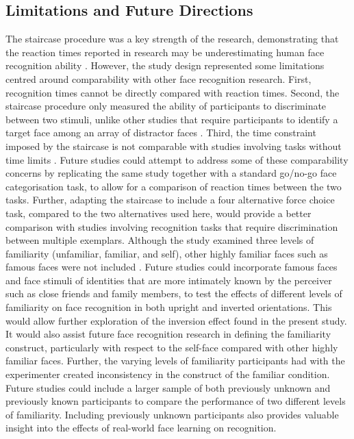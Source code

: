\documentclass[
  10pt,
  letterpaper,
]{article}
\begin{document}
\subsection{Limitations and Future
Directions}\label{limitations-and-future-directions}

The staircase procedure was a key strength of the research,
demonstrating that the reaction times reported in research may be
underestimating human face recognition ability
\citep{besson2016a, caharel2014a, ramon2011a}. However, the study design
represented some limitations centred around comparability with other
face recognition research. First, recognition times cannot be directly
compared with reaction times. Second, the staircase procedure only
measured the ability of participants to discriminate between two
stimuli, unlike other studies that require participants to identify a
target face among an array of distractor faces \citep{megraya2006a}.
Third, the time constraint imposed by the staircase is not comparable
with studies involving tasks without time limits
\citep{zimmermann2019a}. Future studies could attempt to address some of
these comparability concerns by replicating the same study together with
a standard go/no-go face categorisation task, to allow for a comparison
of reaction times between the two tasks. Further, adapting the staircase
to include a four alternative force choice task, compared to the two
alternatives used here, would provide a better comparison with studies
involving recognition tasks that require discrimination between multiple
exemplars. Although the study examined three levels of familiarity
(unfamiliar, familiar, and self), other highly familiar faces such as
famous faces were not included \citep{campbell2020a, wiese2021a}. Future
studies could incorporate famous faces and face stimuli of identities
that are more intimately known by the perceiver such as close friends
and family members, to test the effects of different levels of
familiarity on face recognition in both upright and inverted
orientations. This would allow further exploration of the inversion
effect found in the present study. It would also assist future face
recognition research in defining the familiarity construct, particularly
with respect to the self-face compared with other highly familiar faces.
Further, the varying levels of familiarity participants had with the
experimenter created inconsistency in the construct of the familiar
condition. Future studies could include a larger sample of both
previously unknown and previously known participants to compare the
performance of two different levels of familiarity. Including previously
unknown participants also provides valuable insight into the effects of
real-world face learning on recognition.
\end{document}
